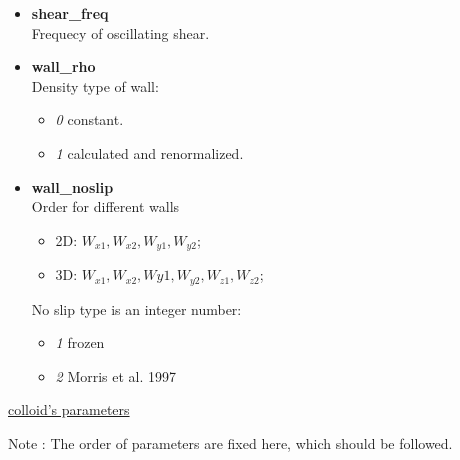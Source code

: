 \documentclass[a4paper,10pt]{article}
\begin{document}
\begin{itemize}
\item 
\textbf{shear\_freq} \\
Frequecy of oscillating shear.

\item 
\textbf{wall\_rho} \\
Density type of wall:
\begin{itemize}
\item \textit{0} constant.
\item \textit{1} calculated and renormalized.
\end{itemize}

\item 
\textbf{wall\_noslip} \\
Order for different walls
\begin{itemize}
\item
2D: $W_{x1}, W_{x2}, W_{y1}, W_{y2}$;
\item
3D: $W_{x1}, W_{x2}, W{y1}, W_{y2}, W_{z1}, W_{z2}$;
\end{itemize}
No slip type is an integer number:
\begin{itemize}
 \item \textit{1} frozen 
 \item \textit{2} Morris et al. 1997~\cite{Morris1997}
\end{itemize}

\end{itemize}
 
\begin{center}
\underline{\textlangle colloid's parameters \textrangle}
\end{center}


Note : The order of parameters are fixed here, 
which should be followed.
\end{document}
